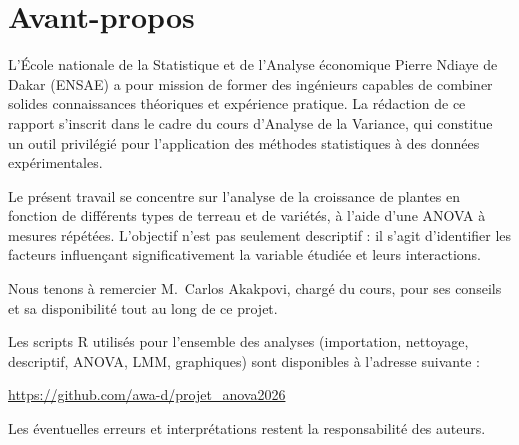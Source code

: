\documentclass[12pt, a4paper]{report}
\begin{document}

\thispagestyle{empty}
\cleardoublepage

\setcounter{page}{1}

\chapter*{Avant-propos}

L'École nationale de la Statistique et de l'Analyse économique Pierre Ndiaye de Dakar (ENSAE) a pour mission de
former des ingénieurs capables de combiner solides connaissances théoriques et expérience
pratique. La rédaction de ce rapport s'inscrit dans le cadre du cours d'Analyse de la
Variance, qui constitue un outil privilégié pour l'application des méthodes statistiques à
des données expérimentales.

Le présent travail se concentre sur l'analyse de la croissance de plantes en fonction de
différents types de terreau et de variétés, à l'aide d'une ANOVA à mesures répétées.
L'objectif n'est pas seulement descriptif : il s'agit d'identifier les facteurs influençant
significativement la variable étudiée et leurs interactions.

Nous tenons à remercier M.\ Carlos Akakpovi, chargé du cours, pour ses
conseils et sa disponibilité tout au long de ce projet.

  \vspace{0.8cm}
Les scripts R utilisés pour l'ensemble des analyses (importation, nettoyage, descriptif,
ANOVA, LMM, graphiques) sont disponibles à l'adresse suivante :
\begin{center}
  \url{https://github.com/awa-d/projet_anova2026}
\end{center}


  \vspace{0.8cm}
Les éventuelles erreurs et interprétations restent la responsabilité des auteurs.
\clearpage

\tableofcontents
\clearpage

\listoffigures
{}

\end{document}
